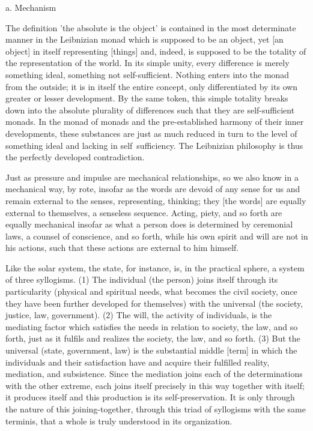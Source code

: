 a. Mechanism

The definition 'the absolute is the object' is
contained in the most determinate manner in
the Leibnizian monad which is supposed to be an object,
yet [an object] in itself representing [things] and, indeed,
is supposed to be the totality of the representation of the world.
In its simple unity, every difference is merely something ideal,
something not self-sufficient. Nothing enters into the monad from
the outside; it is in itself the entire concept, only differentiated by its
own greater or lesser development. By the same token, this simple
totality breaks down into the absolute plurality of differences such
that they are self-sufficient monads. In the monad of monads and
the pre-established harmony of their inner developments, these
substances are just as much reduced in turn to the level of something
ideal and lacking in self~sufficiency. The Leibnizian philosophy is
thus the perfectly developed contradiction.

Just as pressure and impulse are mechanical relationships,
so we also know in a mechanical way, by rote,
insofar as the words are devoid of any sense for us and
remain external to the senses, representing, thinking;
they [the words] are equally external to themselves, a senseless sequence.
Acting, piety, and so forth are equally mechanical
insofar as what a person does is determined by
ceremonial laws, a counsel of conscience, and so forth,
while his own spirit and will are not in his actions,
such that these actions are external to him himself.

Like the solar system, the state, for instance, is,
in the practical sphere, a system of three syllogisms.
(1) The individual (the person) joins itself through its particularity
(physical and spiritual needs, what becomes the civil society,
once they have been further developed for themselves)
with the universal (the society, justice, law, government).
(2) The will, the activity of individuals, is the mediating factor
which satisfies the needs in relation to society, the law, and so forth,
just as it fulfils and realizes the society, the law, and so forth.
(3) But the universal (state, government, law) is the substantial middle [term]
in which the individuals and their satisfaction have and acquire
their fulfilled reality, mediation, and subsistence.
Since the mediation joins each of the determinations with the other extreme,
each joins itself precisely in this way together with itself;
it produces itself and this production is its self-preservation.
It is only through the nature of this joining-together,
through this triad of syllogisms with the same terminis,
that a whole is truly understood in its organization.

